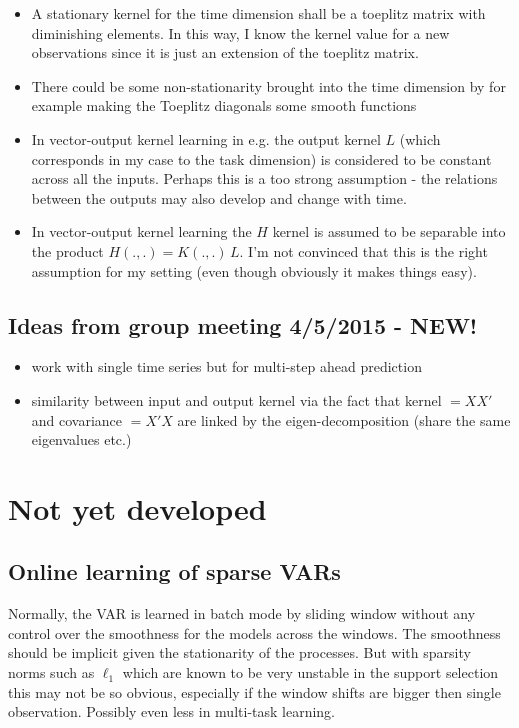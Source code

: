 \documentclass[a4paper]{article}
\begin{document}
\begin{itemize}
\item A stationary kernel for the time dimension shall be a toeplitz matrix with diminishing elements. In this way, I know the kernel value for a new observations since it is just an extension of the toeplitz matrix.
\item There could be some non-stationarity brought into the time dimension by for example making the Toeplitz diagonals some smooth functions
\item In vector-output kernel learning in e.g. \cite{Dinuzzo2015} the output kernel $L$ (which corresponds in my case to the task dimension) is considered to be constant across all the inputs. Perhaps this is a too strong assumption - the relations between the outputs may also develop and change with time.
\item In vector-output kernel learning the $H$ kernel is assumed to be separable into the product $H(.,.) = K(.,.)\, L$. I'm not convinced that this is the right assumption for my setting (even though obviously it makes things easy).
\end{itemize}

\subsection{Ideas from group meeting 4/5/2015 - NEW!}
\begin{itemize}
\item work with single time series but for multi-step ahead prediction
\item similarity between input and output kernel via the fact that kernel $=X X'$ and covariance $=X' X$ are linked by the eigen-decomposition (share the same eigenvalues etc.)
\end{itemize}

\section{Not yet developed}

\subsection{Online learning of sparse VARs}

Normally, the VAR is learned in batch mode by sliding window without any control over the smoothness for the models across the windows. The smoothness should be implicit given the stationarity of the processes. But with sparsity norms such as $\ell_1$ which are known to be very unstable in the support selection this may not be so obvious, especially if the window shifts are bigger then single observation. Possibly even less in multi-task learning.
\end{document}
